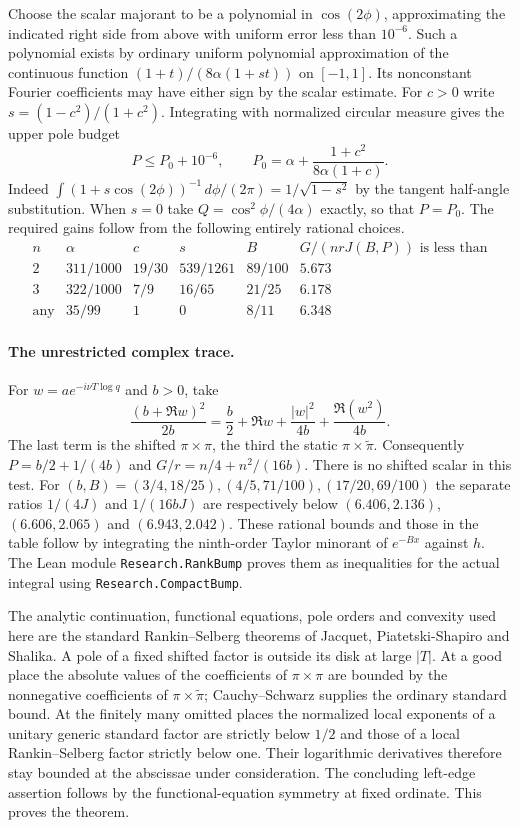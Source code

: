 \documentclass[11pt]{article}
\begin{document}
Choose the scalar majorant to be a polynomial in $\cos(2\phi)$, approximating the indicated right side from above with uniform error less than $10^{-6}$. Such a polynomial exists by ordinary uniform polynomial approximation of the continuous function $(1+t)/(8\alpha(1+st))$ on $[-1,1]$. Its nonconstant Fourier coefficients may have either sign by the scalar estimate. For $c>0$ write $s=(1-c^2)/(1+c^2)$. Integrating with normalized circular measure gives the upper pole budget
\[
             P\le P_0+10^{-6},\qquad
             P_0=\alpha+\frac{1+c^2}{8\alpha(1+c)} .
\]
Indeed $\int(1+s\cos(2\phi))^{-1}\,d\phi/(2\pi)=1/\sqrt{1-s^2}$ by the tangent half-angle substitution. When $s=0$ take $Q=\cos^2\phi/(4\alpha)$ exactly, so that $P=P_0$. The required gains follow from the following entirely rational choices.
\[
\begin{array}{c|cccc|c}
 n&\alpha&c&s&B&G/(nrJ(B,P))\text{ is less than}\\\hline
 2&311/1000&19/30&539/1261&89/100&5.673\\
 3&322/1000&7/9&16/65&21/25&6.178\\
 \text{any}&35/99&1&0&8/11&6.348
\end{array}
\]

\paragraph{The unrestricted complex trace.}
For $w=ae^{-i\nu T\log q}$ and $b>0$, take
\[
 \frac{(b+\Re w)^2}{2b}
 =\frac b2+\Re w+\frac{|w|^2}{4b}+\frac{\Re(w^2)}{4b}.
\]
The last term is the shifted $\pi\times\pi$, the third the static $\pi\times\widetilde\pi$. Consequently $P=b/2+1/(4b)$ and $G/r=n/4+n^2/(16b)$. There is no shifted scalar in this test. For $(b,B)=(3/4,18/25),(4/5,71/100),(17/20,69/100)$ the separate ratios $1/(4J)$ and $1/(16bJ)$ are respectively below $(6.406,2.136)$, $(6.606,2.065)$ and $(6.943,2.042)$. These rational bounds and those in the table follow by integrating the ninth-order Taylor minorant of $e^{-Bx}$ against $h$. The Lean module \texttt{Research.RankBump} proves them as inequalities for the actual integral using \texttt{Research.CompactBump}.

The analytic continuation, functional equations, pole orders and convexity used here are the standard Rankin--Selberg theorems of Jacquet, Piatetski-Shapiro and Shalika. A pole of a fixed shifted factor is outside its disk at large $|T|$. At a good place the absolute values of the coefficients of $\pi\times\pi$ are bounded by the nonnegative coefficients of $\pi\times\widetilde\pi$; Cauchy--Schwarz supplies the ordinary standard bound. At the finitely many omitted places the normalized local exponents of a unitary generic standard factor are strictly below $1/2$ and those of a local Rankin--Selberg factor strictly below one. Their logarithmic derivatives therefore stay bounded at the abscissae under consideration. The concluding left-edge assertion follows by the functional-equation symmetry at fixed ordinate. This proves the theorem.
\end{document}
